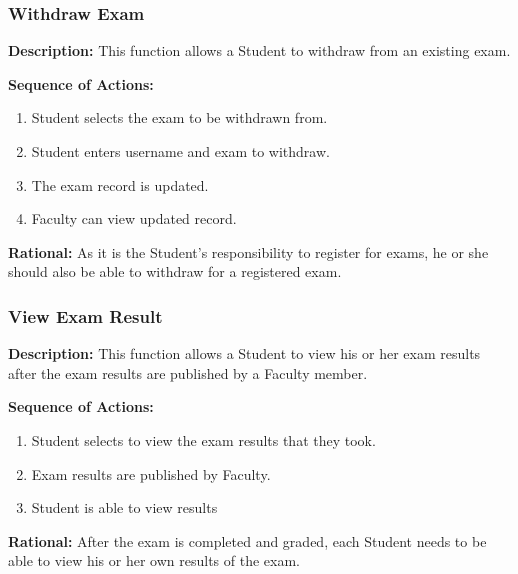    \subsubsection{\large Withdraw Exam} 
   \begin{boxed} %
      \textbf{Description:}
      This function allows a Student to withdraw from an existing exam.
         
      \vspace{3mm}
         \textbf{Sequence of Actions:}
         \begin{enumerate}
               
            \item Student selects the exam to be withdrawn from.
            \item Student enters username and exam to withdraw.
            \item The exam record is updated.
            \item Faculty can view updated record.
         \end{enumerate}

         \textbf{Rational:}
         As it is the Student's responsibility to register for exams, he or she
         should also be able to withdraw for a registered exam.
   \end{boxed} %

   \subsubsection{\large View Exam Result} 
   \begin{boxed} %
      \textbf{Description:}
      This function allows a Student to view his or her exam results after
      the exam results are published by a Faculty member.
         
      \vspace{3mm}
         \textbf{Sequence of Actions:}
         \begin{enumerate}
               
            \item Student selects to view the exam results that they took.
            \item Exam results are published by Faculty.
            \item Student is able to view results
         \end{enumerate}

         \textbf{Rational:}
         After the exam is completed and graded, each Student needs to
         be able to view his or her own results of the exam.
   \end{boxed} %
